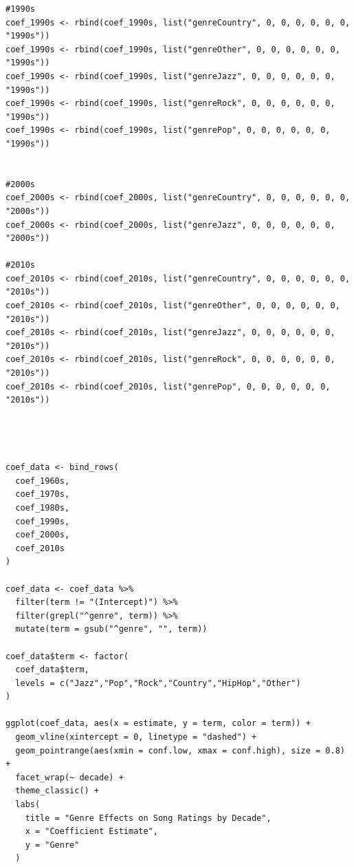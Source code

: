 \documentclass[11pt]{article}
\begin{document}
\begin{verbatim}
#1990s
coef_1990s <- rbind(coef_1990s, list("genreCountry", 0, 0, 0, 0, 0, 0, "1990s"))
coef_1990s <- rbind(coef_1990s, list("genreOther", 0, 0, 0, 0, 0, 0, "1990s"))
coef_1990s <- rbind(coef_1990s, list("genreJazz", 0, 0, 0, 0, 0, 0, "1990s"))
coef_1990s <- rbind(coef_1990s, list("genreRock", 0, 0, 0, 0, 0, 0, "1990s"))
coef_1990s <- rbind(coef_1990s, list("genrePop", 0, 0, 0, 0, 0, 0, "1990s"))


#2000s
coef_2000s <- rbind(coef_2000s, list("genreCountry", 0, 0, 0, 0, 0, 0, "2000s"))
coef_2000s <- rbind(coef_2000s, list("genreJazz", 0, 0, 0, 0, 0, 0, "2000s"))

#2010s
coef_2010s <- rbind(coef_2010s, list("genreCountry", 0, 0, 0, 0, 0, 0, "2010s"))
coef_2010s <- rbind(coef_2010s, list("genreOther", 0, 0, 0, 0, 0, 0, "2010s"))
coef_2010s <- rbind(coef_2010s, list("genreJazz", 0, 0, 0, 0, 0, 0, "2010s"))
coef_2010s <- rbind(coef_2010s, list("genreRock", 0, 0, 0, 0, 0, 0, "2010s"))
coef_2010s <- rbind(coef_2010s, list("genrePop", 0, 0, 0, 0, 0, 0, "2010s"))




coef_data <- bind_rows(
  coef_1960s,
  coef_1970s,
  coef_1980s,
  coef_1990s,
  coef_2000s,
  coef_2010s
)

coef_data <- coef_data %>%
  filter(term != "(Intercept)") %>%
  filter(grepl("^genre", term)) %>%
  mutate(term = gsub("^genre", "", term))

coef_data$term <- factor(
  coef_data$term,
  levels = c("Jazz","Pop","Rock","Country","HipHop","Other")
)

ggplot(coef_data, aes(x = estimate, y = term, color = term)) +
  geom_vline(xintercept = 0, linetype = "dashed") +
  geom_pointrange(aes(xmin = conf.low, xmax = conf.high), size = 0.8) +
  facet_wrap(~ decade) +
  theme_classic() +
  labs(
    title = "Genre Effects on Song Ratings by Decade",
    x = "Coefficient Estimate",
    y = "Genre"
  )
\end{verbatim}
\end{document}
